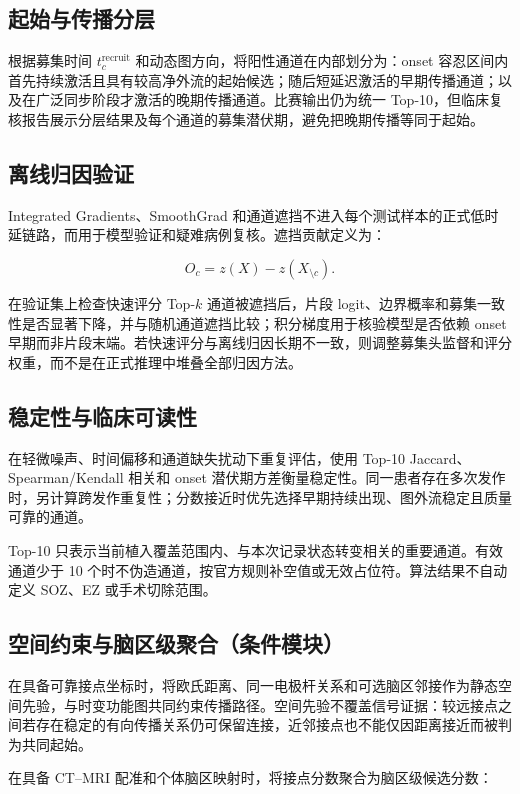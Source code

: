 \subsection{起始与传播分层}

根据募集时间 $t_c^{\mathrm{recruit}}$ 和动态图方向，将阳性通道在内部划分为：onset 容忍区间内首先持续激活且具有较高净外流的起始候选；随后短延迟激活的早期传播通道；以及在广泛同步阶段才激活的晚期传播通道。比赛输出仍为统一 Top-10，但临床复核报告展示分层结果及每个通道的募集潜伏期，避免把晚期传播等同于起始。

\subsection{离线归因验证}

Integrated Gradients、SmoothGrad 和通道遮挡不进入每个测试样本的正式低时延链路，而用于模型验证和疑难病例复核。遮挡贡献定义为：

$$
O_c=z(X)-z(X_{\setminus c}).
$$

在验证集上检查快速评分 Top-$k$ 通道被遮挡后，片段 logit、边界概率和募集一致性是否显著下降，并与随机通道遮挡比较；积分梯度用于核验模型是否依赖 onset 早期而非片段末端。若快速评分与离线归因长期不一致，则调整募集头监督和评分权重，而不是在正式推理中堆叠全部归因方法。

\subsection{稳定性与临床可读性}

在轻微噪声、时间偏移和通道缺失扰动下重复评估，使用 Top-10 Jaccard、Spearman/Kendall 相关和 onset 潜伏期方差衡量稳定性。同一患者存在多次发作时，另计算跨发作重复性；分数接近时优先选择早期持续出现、图外流稳定且质量可靠的通道。

Top-10 只表示当前植入覆盖范围内、与本次记录状态转变相关的重要通道。有效通道少于 10 个时不伪造通道，按官方规则补空值或无效占位符。算法结果不自动定义 SOZ、EZ 或手术切除范围。

\subsection{空间约束与脑区级聚合（条件模块）}

在具备可靠接点坐标时，将欧氏距离、同一电极杆关系和可选脑区邻接作为静态空间先验，与时变功能图共同约束传播路径。空间先验不覆盖信号证据：较远接点之间若存在稳定的有向传播关系仍可保留连接，近邻接点也不能仅因距离接近而被判为共同起始。

在具备 CT--MRI 配准和个体脑区映射时，将接点分数聚合为脑区级候选分数：

